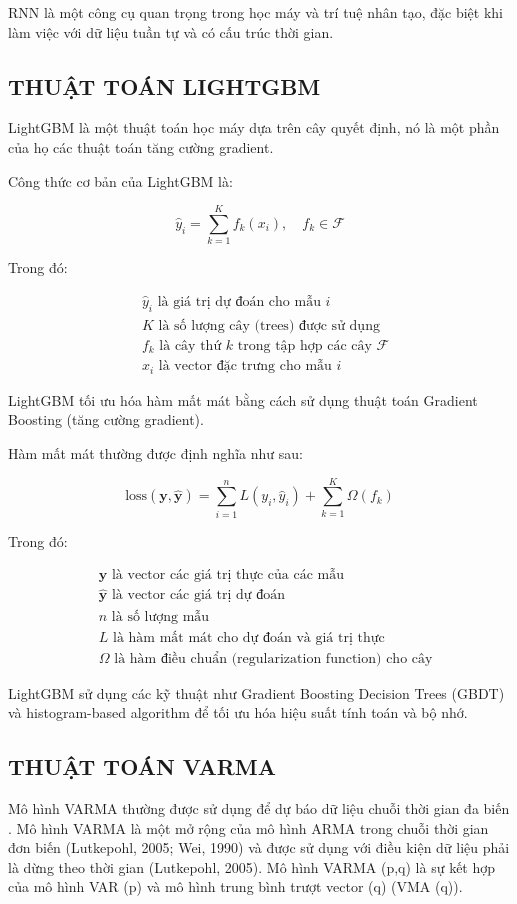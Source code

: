 \documentclass{article}
\begin{document}
\begin{multicols}{2}
RNN là một công cụ quan trọng trong học máy và trí tuệ nhân tạo, đặc biệt khi làm việc với dữ liệu tuần tự và có cấu trúc thời gian.


\subsection{THUẬT TOÁN LIGHTGBM}

LightGBM là một thuật toán học máy dựa trên cây quyết định, nó là một phần của họ các thuật toán tăng cường gradient.

Công thức cơ bản của LightGBM là:

\[
\hat{y}_i = \sum_{k=1}^{K} f_k(x_i), \quad f_k \in \mathcal{F}
\]

Trong đó:

\begin{align*}
&\hat{y}_i \text{ là giá trị dự đoán cho mẫu } i \\
&K \text{ là số lượng cây (trees) được sử dụng} \\
&f_k \text{ là cây thứ } k \text{ trong tập hợp các cây } \mathcal{F} \\
&x_i \text{ là vector đặc trưng cho mẫu } i
\end{align*}

LightGBM tối ưu hóa hàm mất mát bằng cách sử dụng thuật toán Gradient Boosting (tăng cường gradient).

Hàm mất mát thường được định nghĩa như sau:

\[
\text{loss}(\mathbf{y}, \hat{\mathbf{y}}) = \sum_{i=1}^{n} L(y_i, \hat{y}_i) + \sum_{k=1}^{K} \Omega(f_k)
\]

Trong đó:

\begin{align*}
&\mathbf{y} \text{ là vector các giá trị thực của các mẫu} \\
&\hat{\mathbf{y}} \text{ là vector các giá trị dự đoán} \\
&n \text{ là số lượng mẫu} \\
&L \text{ là hàm mất mát cho dự đoán và giá trị thực} \\
&\Omega \text{ là hàm điều chuẩn (regularization function) cho cây}
\end{align*}

LightGBM sử dụng các kỹ thuật như Gradient Boosting Decision Trees (GBDT) và histogram-based algorithm để tối ưu hóa hiệu suất tính toán và bộ nhớ.
\subsection{THUẬT TOÁN VARMA}
Mô hình VARMA thường được sử dụng để dự báo dữ liệu chuỗi thời gian đa biến . Mô hình VARMA là một mở rộng của mô hình ARMA trong chuỗi thời gian đơn biến (Lutkepohl, 2005; Wei, 1990) và được sử dụng với điều kiện dữ liệu phải là dừng theo thời gian (Lutkepohl, 2005). Mô hình VARMA (p,q) là sự kết hợp của mô hình VAR (p) và mô hình trung bình trượt vector (q) (VMA (q)).\\
 

\end{multicols}
\end{document}
